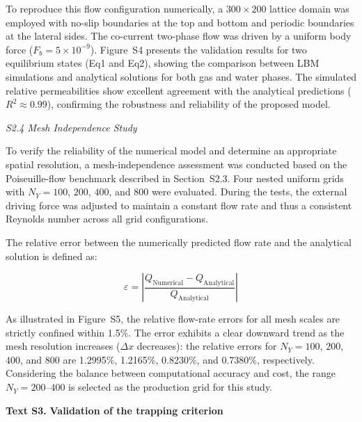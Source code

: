 \documentclass[draft,wrr]{agutexSI2019}
\begin{document}
\begin{article}
To reproduce this flow configuration numerically, a $300\times200$ lattice
domain was employed with no-slip boundaries at the top and bottom and periodic
boundaries at the lateral sides. The co-current two-phase flow was driven by a
uniform body force ($F_b = 5 \times 10^{-9}$). Figure~S4 presents the validation
results for two equilibrium states (Eq1 and Eq2), showing the comparison between
LBM simulations and analytical solutions for both gas and water phases. The
simulated relative permeabilities show excellent agreement with the analytical
predictions ($R^2 \approx 0.99$), confirming the robustness and reliability of the
proposed model.

\noindent\textit{S2.4 Mesh Independence Study}

To verify the reliability of the numerical model and determine an appropriate
spatial resolution, a mesh-independence assessment was conducted based on the
Poiseuille-flow benchmark described in Section~S2.3. Four nested uniform grids
with $N_Y=100$, $200$, $400$, and $800$ were evaluated. During the tests, the
external driving force was adjusted to maintain a constant flow rate and thus a
consistent Reynolds number across all grid configurations.

The relative error between the numerically predicted flow rate and the
analytical solution is defined as:
\begin{linenomath*}
\begin{equation}
\varepsilon=
\left|
\frac{Q_{\mathrm{Numerical}}-Q_{\mathrm{Analytical}}}{Q_{\mathrm{Analytical}}}
\right|
\label{eq:mesh_relative_error}
\end{equation}
\end{linenomath*}

As illustrated in Figure~S5, the relative flow-rate errors for all mesh scales
are strictly confined within 1.5\%. The error exhibits a clear downward trend
as the mesh resolution increases ($\Delta x$ decreases): the relative errors for
$N_Y=100$, $200$, $400$, and $800$ are 1.2995\%, 1.2165\%, 0.8230\%, and
0.7380\%, respectively. Considering the balance between computational accuracy
and cost, the range $N_Y=200$--$400$ is selected as the production grid for
this study.


\noindent\textbf{Text S3.}
\textbf{Validation of the trapping criterion}


\end{article}
\end{document}
